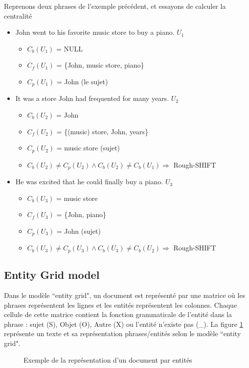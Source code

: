 \documentclass{KodeBook}
\begin{document}
Reprenons deux phrases de l'exemple précédent, et essayons de calculer la centralité
\begin{itemize}
	\item John went to his favorite music store to buy a piano. $U_1$
	\begin{itemize}
		\item $C_b(U_1)$ = NULL
		\item $C_f(U_1)$ = \{John, music store, piano\}
		\item $C_p(U_1)$ = John (le sujet)
	\end{itemize}
	\item It was a store John had frequented for many years. $U_2$
	\begin{itemize}
		\item $C_b(U_2)$ = John
		\item $C_f(U_2)$ = \{(music) store, John, years\}
		\item $C_p(U_2)$ =  music store (sujet)
		\item $C_b(U_2) \ne C_p(U_2) \wedge C_b(U_2) \ne C_b(U_1) \Rightarrow$ Rough-SHIFT
	\end{itemize}
	\item He was excited that he could finally buy a piano. $U_3$
	\begin{itemize}
		\item $C_b(U_3)$ = music store
		\item $C_f(U_3)$ = \{John, piano\}
		\item $C_p(U_3)$ =  John (sujet)
		\item $C_b(U_3) \ne C_p(U_3) \wedge C_b(U_3) \ne C_b(U_2) \Rightarrow$ Rough-SHIFT
	\end{itemize}
\end{itemize}


\subsection{Entity Grid model}

Dans le modèle ``entity grid", un document est représenté par une matrice où les phrases représentent les lignes et les entités représentent les colonnes. 
Chaque cellule de cette matrice contient la fonction grammaticale de l'entité dans la phrase : sujet (S), Objet (O), Autre (X) ou l'entité n'existe pas (\_). 
La figure \ref{fig:entity-grid-rep} représente un texte et sa représentation phrases/entités selon le modèle ``entity grid". 

\begin{figure}[!ht]
	\centering
	
	\caption[Exemple de la représentation d'un document par entités]{Exemple de la représentation d'un document par entités \cite{2008-barzilay-lapata}}
	\label{fig:entity-grid-rep}
\end{figure}
\end{document}
